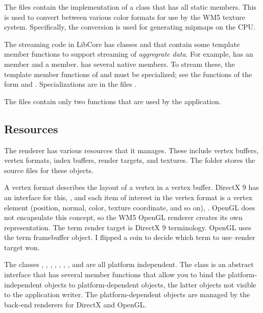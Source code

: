 \documentclass{article}
\begin{document}
The files  contain the implementation of a class
 that has all static members.  This is used to convert between
various color formats for use by the WM5 texture system.  Specifically, the
conversion is used for generating mipmaps on the CPU.

The streaming code in LibCore has classes  and 
that contain some template member functions to support streaming of
{\em aggregrate data}.  For example,  has an 
member and a  member.   has several native
members.  To stream these, the template member functions of 
and  must be specialized; see the functions of the form
 and .  Specializations are in
the files .

The files  contain only two functions that are used by
the  application.

\subsection{Resources}

The renderer has various resources that it manages.  These include vertex
buffers, vertex formats, index buffers, render targets, and textures.  The
 folder stores the source files for these objects.

A vertex format describes the layout of a vertex in a vertex buffer.  DirectX 9
has an interface for this, , and each
item of interest in the vertex format is a vertex element (position, normal,
color, texture coordinate, and so on), .  OpenGL does
not encapsulate this concept, so the WM5 OpenGL renderer creates its own
representation.  The term render target is DirectX 9 terminology.  OpenGL
uses the term framebuffer object.  I flipped a coin to decide which term to
use--render target won.

The classes , , ,
, , , ,
and  are all platform independent.  The 
class is an abstract interface that has several member functions that
allow you to bind the platform-independent objects to platform-dependent
objects, the latter objects not visible to the application writer.  The
platform-dependent objects are managed by the back-end renderers for
DirectX and OpenGL.
\end{document}
